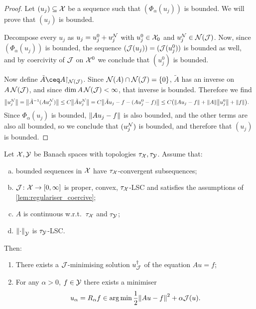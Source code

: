 \begin{proof}
	Let $(u_j) \subseteq \mathcal X$ be a sequence such that $(\Phi_\alpha(u_j))$ is bounded. We will prove that $(u_j)$ is bounded. 
	
	Decompose every $u_j$ as $u_j = u_j^0 + u_j^{\mathcal N}$ with $u_j^0 \in \mathcal X_0$ and $u_j^{\mathcal N} \in \operatorname{\mathcal N}(\mathcal J)$. Now, since $(\Phi_\alpha(u_j))$ is bounded, the sequence $(\mathcal J(u_j)) = (\mathcal J(u_j^0))$ is bounded as well, and by coercivity of $\mathcal J$ on $\mathcal X^0$ we conclude that $(u_j^0)$ is bounded. 
	
	Now define $\tilde A \ceq A\restr_{\Nul(\JJ)}$. Since $\operatorname{\mathcal N}(A) \cap \operatorname{\mathcal N}(\mathcal J) = \qty{0}$, $\tilde A$ has an inverse on $A \operatorname{\mathcal N}(\mathcal J)$, and since $\dim A\operatorname{\mathcal N}(\mathcal J) < \infty$, that inverse is bounded. Therefore we find
	\begin{align*}
		\norm{u_j^{\mathcal N}} &= \norm{\tilde A^{-1} ( A u_j^{\mathcal N})} \leq C \norm{\tilde A u_j^{\mathcal N}} = C \norm{\tilde A u_j - f - (A u_j^0 - f)} \leq C \qty(\norm{Au_j - f} + \norm{A} \norm{u_j^0} + \norm{f}). 
	\end{align*}
	Since $\Phi_\alpha(u_j)$ is bounded, $\norm{Au_j - f}$ is also bounded, and the other terms are also all bounded, so we conclude that $(u_j^{\mathcal N})$ is bounded, and therefore that $(u_j)$ is bounded. 
\end{proof}

\begin{theorem} \label{thm:minimiser_existence}
	Let $\mathcal X, \mathcal Y$ be Banach spaces with topologies $\tau_\mathcal X, \tau_\mathcal Y$. Assume that:
	\begin{enumerate}[(a)]
		\item bounded sequences in $\mathcal X$ have $\tau_\mathcal X$-convergent subsequences;
		\item $\mathcal J\colon \mathcal X \to [0, \infty]$ is proper, convex, $\tau_\mathcal X$-LSC and satisfies the assumptions of \cref{lem:regulariser_coercive};
		\item $A$ is continuous w.r.t.\ $\tau_\mathcal X$ and $\tau_\mathcal Y$;
		\item $\norm{\cdot}_\mathcal Y$ is $\tau_\mathcal Y$-LSC. 
	\end{enumerate}

Then:
\begin{enumerate}
	\item There exists a $\mathcal J$-minimising solution $u_\mathcal J^\dagger$ of the equation $Au = f$;
	\item For any $\alpha > 0$, $f \in \mathcal Y$ there exists a minimiser
	\[
 	u_\alpha = R_\alpha f \in \operatorname*{arg\,min} \frac12 \norm{Au - f}^2 + \alpha \mathcal J(u). 
	\]
\end{enumerate}
\end{theorem}

